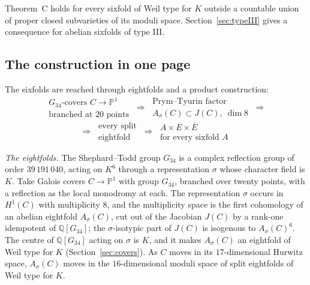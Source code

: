 \documentclass[11pt]{amsart}
\theoremstyle{definition}
\theoremstyle{remark}
\newcommand{\Q}{\mathbb Q}
\newcommand{\PP}{\mathbb P}
\begin{document}
Theorem~C holds for every sixfold of Weil type for $K$ outside a countable union of proper closed subvarieties of its moduli space. Section~\ref{sec:typeIII} gives a consequence for abelian sixfolds of type III.

\subsection{The construction in one page}\label{subsec:map}
The sixfolds are reached through eightfolds and a product construction:
\[
\begin{array}{c}
\text{$G_{34}$-covers $C\to\PP^1$}\\
\text{branched at $20$ points}
\end{array}
\ \Longrightarrow\
\begin{array}{c}
\text{Prym--Tyurin factor}\\
A_\sigma(C)\subset J(C),\ \dim 8
\end{array}
\ \Longrightarrow
\]
\[
\Longrightarrow\
\begin{array}{c}
\text{every split}\\
\text{eightfold}
\end{array}
\ \Longrightarrow\
\begin{array}{c}
A\times E\times\bar E\\
\text{for every sixfold }A
\end{array}
\]

\emph{The eightfolds.} The Shephard--Todd group $G_{34}$ is a complex reflection group of order $39\,191\,040$, acting on $K^6$ through a representation $\sigma$ whose character field is $K$. Take Galois covers $C\to\PP^1$ with group $G_{34}$, branched over twenty points, with a reflection as the local monodromy at each. The representation $\sigma$ occurs in $H^1(C)$ with multiplicity $8$, and the multiplicity space is the first cohomology of an abelian eightfold $A_\sigma(C)$, cut out of the Jacobian $J(C)$ by a rank-one idempotent of $\Q[G_{34}]$; the $\sigma$-isotypic part of $J(C)$ is isogenous to $A_\sigma(C)^6$. The centre of $\Q[G_{34}]$ acting on $\sigma$ is $K$, and it makes $A_\sigma(C)$ an eightfold of Weil type for $K$ (Section~\ref{sec:covers}). As $C$ moves in its $17$-dimensional Hurwitz space, $A_\sigma(C)$ moves in the $16$-dimensional moduli space of split eightfolds of Weil type for $K$.
\end{document}
